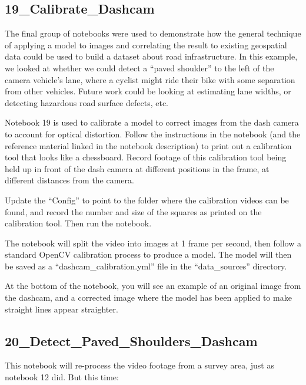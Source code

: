 \documentclass[11pt,twoside]{report}
\begin{document}
\subsection{19\_Calibrate\_Dashcam}
\label{a19}

The final group of notebooks were used to demonstrate how the general technique of applying a model to images and correlating the result to existing geospatial data could be used to build a dataset about road infrastructure.  In this example, we looked at whether we could detect a ``paved shoulder'' to the left of the camera vehicle's lane, where a cyclist might ride their bike with some separation from other vehicles.  Future work could be looking at estimating lane widths, or detecting hazardous road surface defects, etc.

Notebook 19 is used to calibrate a model to correct images from the dash camera to account for optical distortion.  Follow the instructions in the notebook (and the reference material linked in the notebook description) to print out a calibration tool that looks like a chessboard.  Record footage of this calibration tool being held up in front of the dash camera at different positions in the frame, at different distances from the camera.

Update the ``Config'' to point to the folder where the calibration videos can be found, and record the number and size of the squares as printed on the calibration tool.  Then run the notebook.

The notebook will split the video into images at 1 frame per second, then follow a standard OpenCV calibration process to produce a model.  The model will then be saved as a ``dashcam\_calibration.yml'' file in the ``data\_sources'' directory.

At the bottom of the notebook, you will see an example of an original image from the dashcam, and a corrected image where the model has been applied to make straight lines appear straighter.


\subsection{20\_Detect\_Paved\_Shoulders\_Dashcam}
\label{a20}

This notebook will re-process the video footage from a survey area, just as notebook 12 did.  But this time:
\end{document}
